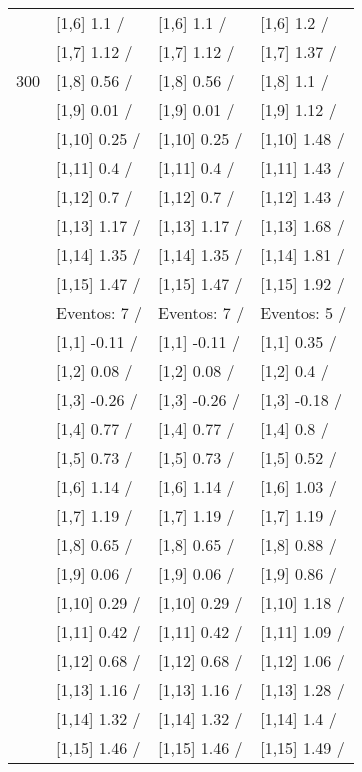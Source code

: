 \begin{table}
\begin{tabular}[t]{llll}
 & {}[1,6] 1.1  / & {}[1,6] 1.1  / & {}[1,6] 1.2  /\\
 & {}[1,7] 1.12  / & {}[1,7] 1.12  / & {}[1,7] 1.37  /\\
300 & {}[1,8] 0.56  / & {}[1,8] 0.56  / & {}[1,8] 1.1  /\\
\addlinespace
 & {}[1,9] 0.01  / & {}[1,9] 0.01  / & {}[1,9] 1.12  /\\
 & {}[1,10] 0.25  / & {}[1,10] 0.25  / & {}[1,10] 1.48  /\\
 & {}[1,11] 0.4  / & {}[1,11] 0.4  / & {}[1,11] 1.43  /\\
 & {}[1,12] 0.7  / & {}[1,12] 0.7  / & {}[1,12] 1.43  /\\
 & {}[1,13] 1.17  / & {}[1,13] 1.17  / & {}[1,13] 1.68  /\\
\addlinespace
 & {}[1,14] 1.35  / & {}[1,14] 1.35  / & {}[1,14] 1.81  /\\
 & {}[1,15] 1.47  / & {}[1,15] 1.47  / & {}[1,15] 1.92  /\\
 & Eventos:  7 / & Eventos:  7 / & Eventos:  5 /\\
 & {}[1,1] -0.11  / & {}[1,1] -0.11  / & {}[1,1] 0.35  /\\
 & {}[1,2] 0.08  / & {}[1,2] 0.08  / & {}[1,2] 0.4  /\\
\addlinespace
 & {}[1,3] -0.26  / & {}[1,3] -0.26  / & {}[1,3] -0.18  /\\
 & {}[1,4] 0.77  / & {}[1,4] 0.77  / & {}[1,4] 0.8  /\\
 & {}[1,5] 0.73  / & {}[1,5] 0.73  / & {}[1,5] 0.52  /\\
 & {}[1,6] 1.14  / & {}[1,6] 1.14  / & {}[1,6] 1.03  /\\
 & {}[1,7] 1.19  / & {}[1,7] 1.19  / & {}[1,7] 1.19  /\\
\addlinespace
500 & {}[1,8] 0.65  / & {}[1,8] 0.65  / & {}[1,8] 0.88  /\\
 & {}[1,9] 0.06  / & {}[1,9] 0.06  / & {}[1,9] 0.86  /\\
 & {}[1,10] 0.29  / & {}[1,10] 0.29  / & {}[1,10] 1.18  /\\
 & {}[1,11] 0.42  / & {}[1,11] 0.42  / & {}[1,11] 1.09  /\\
 & {}[1,12] 0.68  / & {}[1,12] 0.68  / & {}[1,12] 1.06  /\\
\addlinespace
 & {}[1,13] 1.16  / & {}[1,13] 1.16  / & {}[1,13] 1.28  /\\
 & {}[1,14] 1.32  / & {}[1,14] 1.32  / & {}[1,14] 1.4  /\\
 & {}[1,15] 1.46  / & {}[1,15] 1.46  / & {}[1,15] 1.49  /\\
\bottomrule
\end{tabular}
\end{table}
